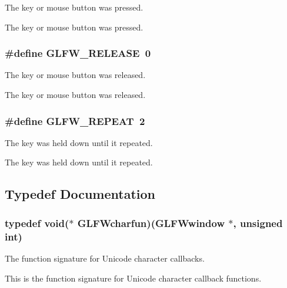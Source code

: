 The key or mouse button was pressed. 

The key or mouse button was pressed. \hypertarget{group__input_gda11d965c4da13090ad336e030e4d11f}{
\subsubsection[GLFW\_\-RELEASE]{\setlength{\rightskip}{0pt plus 5cm}\#define GLFW\_\-RELEASE~0}}
\label{group__input_gda11d965c4da13090ad336e030e4d11f}


The key or mouse button was released. 

The key or mouse button was released. \hypertarget{group__input_gc96fd3b9fc66c6f0eebaf6532595338f}{
\subsubsection[GLFW\_\-REPEAT]{\setlength{\rightskip}{0pt plus 5cm}\#define GLFW\_\-REPEAT~2}}
\label{group__input_gc96fd3b9fc66c6f0eebaf6532595338f}


The key was held down until it repeated. 

The key was held down until it repeated. 

\subsection{Typedef Documentation}
\hypertarget{group__input_g1103f1876518acecb5976f6b307c51d1}{
\subsubsection[GLFWcharfun]{\setlength{\rightskip}{0pt plus 5cm}typedef void($\ast$  {\bf GLFWcharfun})({\bf GLFWwindow} $\ast$, unsigned int)}}
\label{group__input_g1103f1876518acecb5976f6b307c51d1}


The function signature for Unicode character callbacks. 

This is the function signature for Unicode character callback functions.

